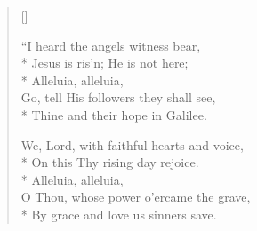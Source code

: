 \begin{verse}[\versewidth]
\begin{patverse}
 ``I heard the angels witness bear,\\*
Jesus is ris'n; He is not here;        \\*        
Alleluia, alleluia,                       \\ 
Go, tell His followers they shall see,       \\*  
Thine and their hope in Galilee.         
\end{patverse}

\begin{patverse}
 We, Lord, with faithful hearts and voice,              \\*
On this Thy rising day rejoice.                \\*
Alleluia, alleluia,                            \\
O Thou, whose power o'ercame the grave,            \\*
By grace and love us sinners save.      
\end{patverse}
\end{verse}

